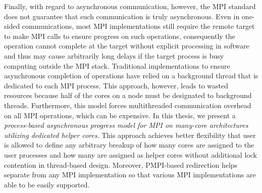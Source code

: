 Finally, with regard to asynchronous communication, however, the MPI standard does 
not guarantee that such communication is truly asynchronous. Even in one-sided 
communications, most MPI implementations still require the remote target to make 
MPI calls to ensure progress on such operations, consequently the operation 
cannot complete at the target without explicit processing in software and 
thus may cause arbitrarily long delays if the target process is busy computing 
outside the MPI stack. Traditional implementations to ensure asynchronous 
completion of operations have relied on a background thread that is 
dedicated to each MPI process. This approach, however, leads to wasted resources
because half of the cores on a node must be designated to background threads. 
Furthermore, this model forces multithreaded communication overhead on all MPI 
operations, which can be expensive.
In this thesis, we present 
a \textit{process-based asynchronous progress model for MPI on many-core 
architectures utilizing dedicated helper cores}. This approach achieves better 
flexibility that user is allowed to define any arbitrary breakup of how many 
cores are assigned to the user processes and how many are assigned as helper 
cores without additional lock contention in thread-based design. Moreover, 
PMPI-based redirection helps separate from any MPI implementation so that various 
MPI implementations are able to be easily supported. 

\clearpage

